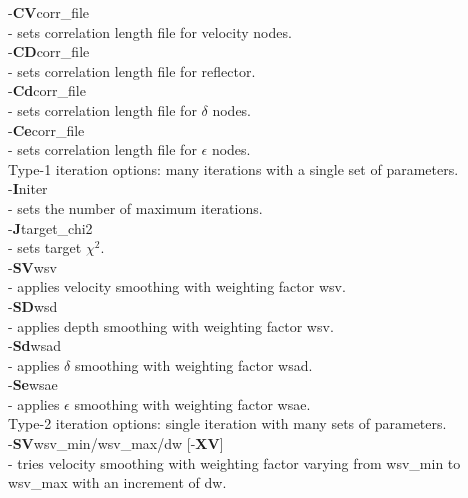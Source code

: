 \documentclass[twoside,final,onecolumn]{article}
\newcommand{\forceindent}{\leavevmode{\parindent=1em\indent}}
\begin{document}
\forceindent -\textbf{CV}corr\_file \\
\forceindent\forceindent - sets correlation length file for velocity nodes.\\[6pt]
\forceindent -\textbf{CD}corr\_file \\
\forceindent\forceindent - sets correlation length file for reflector.\\[6pt]
\forceindent -\textbf{Cd}corr\_file \\
\forceindent\forceindent - sets correlation length file for $\delta$ nodes.\\[6pt]
\forceindent -\textbf{Ce}corr\_file \\
\forceindent\forceindent - sets correlation length file for $\epsilon$ nodes.\\[6pt]
\forceindent Type-1 iteration options: many iterations with a single set of parameters.\\
\forceindent\forceindent -\textbf{I}niter \\
\forceindent\forceindent\forceindent - sets the number of maximum iterations.\\[6pt]
\forceindent\forceindent -\textbf{J}target\_chi2 \\
\forceindent\forceindent\forceindent - sets target $\chi^2$.\\[6pt]
\forceindent\forceindent -\textbf{SV}wsv \\
\forceindent\forceindent\forceindent - applies velocity smoothing with weighting factor wsv.\\[6pt]
\forceindent\forceindent -\textbf{SD}wsd \\
\forceindent\forceindent\forceindent - applies depth smoothing with weighting factor wsv.\\[6pt]
\forceindent\forceindent -\textbf{Sd}wsad \\
\forceindent\forceindent\forceindent - applies $\delta$ smoothing with weighting factor wsad.\\[6pt]
\forceindent\forceindent -\textbf{Se}wsae \\
\forceindent\forceindent\forceindent - applies $\epsilon$ smoothing with weighting factor wsae.\\[6pt]
\forceindent Type-2 iteration options: single iteration with many sets of parameters.\\
\forceindent\forceindent -\textbf{SV}wsv\_min/wsv\_max/dw [-\textbf{XV}] \\
\forceindent\forceindent\forceindent - tries velocity smoothing with weighting factor varying from wsv\_min to wsv\_max with an increment of dw.\\
\end{document}

